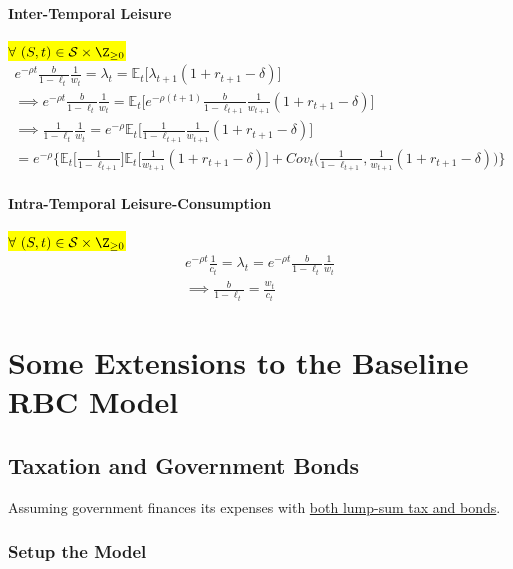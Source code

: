 \documentclass[11pt]{article}
\newcommand{\expat}[2]{\mathbb{E}_{#1}\Big[{#2}\Big]}
\begin{document}
				\paragraph{Inter-Temporal Leisure} \hl{$\forall \ (S, t) \in \mc{S} \times \Z_{\geq 0}$}
				\begin{gather}
					e^{-\rho t} \frac{b}{1-\ell_t} \frac{1}{w_t} = \lambda_t = \expat{t}{\lambda_{t+1} (1+r_{t+1}-\delta)} \\
					\implies e^{-\rho t} \frac{b}{1-\ell_t} \frac{1}{w_t} = \expat{t}{e^{-\rho(t+1)} \frac{b}{1-\ell_{t+1}} \frac{1}{w_{t+1}} (1+r_{t+1}-\delta)} \\
					\implies \frac{1}{1-\ell_t}\frac{1}{w_t} = e^{-\rho} \expat{t}{\frac{1}{1-\ell_{t+1}} \frac{1}{w_{t+1}} (1 + r_{t+1} - \delta)} \\
					= e^{-\rho}\Big \{
						\expat{t}{\frac{1}{1 - \ell_{t+1}}} \expat{t}{\frac{1}{w_{t+1}} (1 + r_{t+1} - \delta)} + Cov_t \Big(
								\frac{1}{1-\ell_{t+1}}, \frac{1}{w_{t+1}} (1 + r_{t+1} - \delta)
							\Big)
					\Big \}
				\end{gather}
				
				\paragraph{Intra-Temporal Leisure-Consumption} \hl{$\forall \ (S, t) \in \mc{S} \times \Z_{\geq 0}$}
					\begin{gather}
						e^{-\rho t} \frac{1}{c_t} = \lambda_t =  e^{-\rho t} \frac{b}{1 - \ell_t} \frac{1}{w_t} \\
						\implies \frac{b}{1-\ell_t} = \frac{w_t}{c_t}
					\end{gather}
	
	\section{Some Extensions to the Baseline RBC Model}
		\setcounter{equation}{0}
		\subsection{Taxation and Government Bonds}
			\begin{assumption}
				Assuming government finances its expenses with \ul{both lump-sum tax and bonds}.
			\end{assumption}
			
			\subsubsection{Setup the Model}
\end{document}
